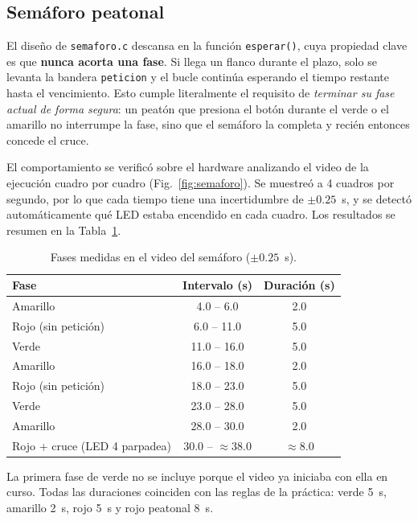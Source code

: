 \documentclass[conference]{IEEEtran}
\begin{document}
\subsection{Semáforo peatonal}
El diseño de \texttt{semaforo.c} descansa en la función \texttt{esperar()}, cuya propiedad clave es que \textbf{nunca acorta una fase}. Si llega un flanco durante el plazo, solo se levanta la bandera \texttt{peticion} y el bucle continúa esperando el tiempo restante hasta el vencimiento. Esto cumple literalmente el requisito de \textit{terminar su fase actual de forma segura}: un peatón que presiona el botón durante el verde o el amarillo no interrumpe la fase, sino que el semáforo la completa y recién entonces concede el cruce.

El comportamiento se verificó sobre el hardware analizando el video de la ejecución cuadro por cuadro (Fig.~\ref{fig:semaforo}). Se muestreó a 4 cuadros por segundo, por lo que cada tiempo tiene una incertidumbre de $\pm 0.25$~s, y se detectó automáticamente qué LED estaba encendido en cada cuadro. Los resultados se resumen en la Tabla~\ref{tab:fases}.

\begin{table}[t]
	\centering
	\caption{Fases medidas en el video del semáforo ($\pm 0.25$~s).}
	\label{tab:fases}
	\footnotesize
	\begin{tabular}{|l|c|c|}
		\hline
		\textbf{Fase} & \textbf{Intervalo (s)} & \textbf{Duración (s)} \\
		\hline
		Amarillo & 4.0 -- 6.0 & 2.0 \\
		\hline
		Rojo (sin petición) & 6.0 -- 11.0 & 5.0 \\
		\hline
		Verde & 11.0 -- 16.0 & 5.0 \\
		\hline
		Amarillo & 16.0 -- 18.0 & 2.0 \\
		\hline
		Rojo (sin petición) & 18.0 -- 23.0 & 5.0 \\
		\hline
		Verde & 23.0 -- 28.0 & 5.0 \\
		\hline
		Amarillo & 28.0 -- 30.0 & 2.0 \\
		\hline
		Rojo + cruce (LED 4 parpadea) & 30.0 -- $\approx$38.0 & $\approx$8.0 \\
		\hline
	\end{tabular}
\end{table}

La primera fase de verde no se incluye porque el video ya iniciaba con ella en curso. Todas las duraciones coinciden con las reglas de la práctica: verde 5~s, amarillo 2~s, rojo 5~s y rojo peatonal 8~s.
\end{document}
